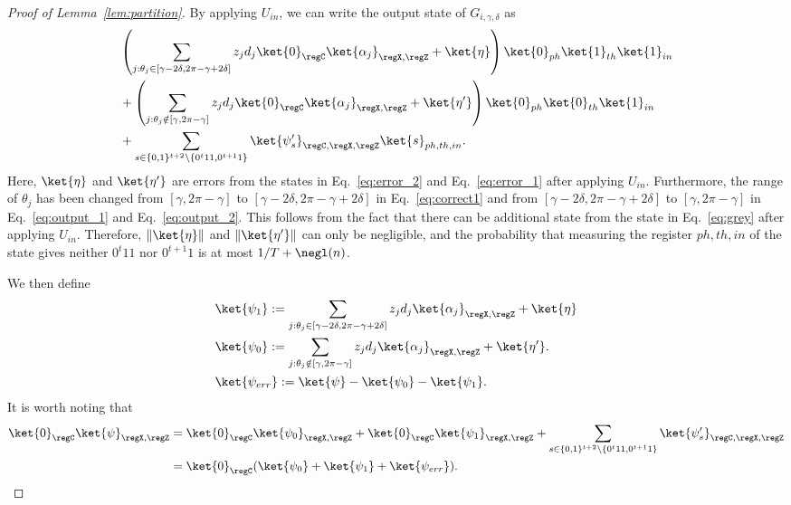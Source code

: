 \begin{proof}[Proof of Lemma~\ref{lem:partition}]
By applying $U_{in}$, we can write the output state of $G_{i,\gamma,\delta}$ as
\begin{align}
    &\left(\sum_{j: \theta_j\in [\gamma-2\delta,2\pi-\gamma+2\delta]} z_jd_j \ket{0}_{\regC}\ket{\alpha_j}_{\regX,\regZ}+\ket{\eta}\right) \ket{0}_{ph}\ket{1}_{th}\ket{1}_{in} \label{eq:output_1}\\
    &+ \left(\sum_{j: \theta_j\notin [\gamma,2\pi-\gamma]} z_jd_j \ket{0}_{\regC}\ket{\alpha_j}_{\regX,\regZ}+\ket{\eta'}\right) \ket{0}_{ph}\ket{0}_{th}\ket{1}_{in}\label{eq:output_2}\\
    &+\sum_{s\in \{0,1\}^{t+2}\setminus \{0^t11,0^{t+1}1\}}\ket{\psi'_{s}}_{\regC,\regX,\regZ}\ket{s}_{ph,th,in}\label{eq:output_err}.
\end{align}
Here, $\ket{\eta}$ and $\ket{\eta'}$ are errors from the states in Eq.~\ref{eq:error_2} and Eq.~\ref{eq:error_1} after applying $U_{in}$. Furthermore, the range of $\theta_j$ has been changed from $[\gamma,2\pi-\gamma]$ to $[\gamma-2\delta, 2\pi-\gamma+2\delta]$ in Eq.~\ref{eq:correct1} and from $[\gamma-2\delta,2\pi-\gamma+2\delta]$ to $[\gamma,2\pi-\gamma]$ in Eq.~\ref{eq:output_1} and Eq.~\ref{eq:output_2}. This follows from the fact that there can be additional state from the state in Eq.~\ref{eq:grey} after applying $U_{in}$. Therefore, $\|\ket{\eta}\|$ and $\|\ket{\eta'}\|$ can only be negligible, and the probability that measuring the register $ph,th,in$ of the state gives neither $0^t11$ nor $0^{t+1}1$ is at most $1/T+\negl(n)$.  



We then define
\begin{align*}
&\ket{\psi_1}:=\sum_{j: \theta_j\in [\gamma-2\delta,2\pi-\gamma+2\delta]} z_jd_j \ket{\alpha_j}_{\regX,\regZ}+\ket{\eta}\\
&\ket{\psi_0}:=\sum_{j: \theta_j\notin [\gamma,2\pi-\gamma]} z_jd_j \ket{\alpha_j}_{\regX,\regZ}+\ket{\eta'}.\\
&\ket{\psi_{err}}:= \ket{\psi}-\ket{\psi_0}-\ket{\psi_1}. 
\end{align*}
It is worth noting that 
\begin{align*}
    \ket{0}_{\regC}\ket{\psi}_{\regX,\regZ} &=  \ket{0}_{\regC}\ket{\psi_0}_{\regX,\regZ} + \ket{0}_{\regC}\ket{\psi_1}_{\regX,\regZ} + 
    \sum_{s\in \{0,1\}^{t+2}\setminus \{0^t11,0^{t+1}1\}}\ket{\psi'_{s}}_{\regC,\regX,\regZ}\\
    &= \ket{0}_{\regC}(\ket{\psi_0}+\ket{\psi_1}+\ket{\psi_{err}}).
\end{align*}



\end{proof}

